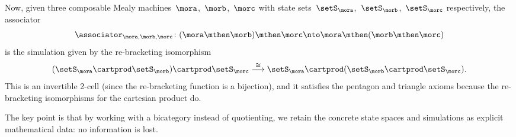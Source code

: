 \begin{example}
    Now, given three composable Mealy machines~$\mora$,~$\morb$,~$\morc$ with state sets~$\setS_\mora$,~$\setS_\morb$,~$\setS_\morc$ respectively, the associator
    \begin{equation}
        \associator_{\mora,\morb,\morc} \colon (\mora \mthen \morb) \mthen \morc \nto \mora \mthen (\morb \mthen \morc)
    \end{equation}
    is the simulation given by the re-bracketing isomorphism
    \begin{equation}
        (\setS_\mora \cartprod \setS_\morb) \cartprod \setS_\morc \overset{\cong}{\longrightarrow} \setS_\mora \cartprod (\setS_\morb \cartprod \setS_\morc).
    \end{equation}
    This is an invertible 2-cell (since the re-bracketing function is a bijection), and it satisfies the pentagon and triangle axioms because the re-bracketing isomorphisms for the cartesian product do.

    The key point is that by working with a bicategory instead of quotienting, we retain the concrete state spaces and simulations as explicit mathematical data: no information is lost.
\end{example}

